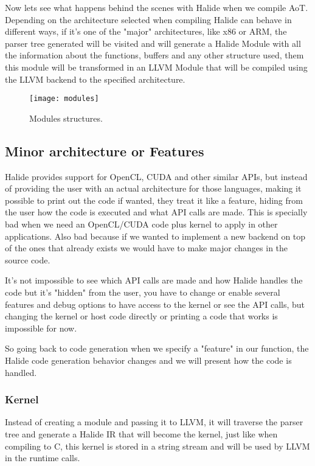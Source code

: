 \documentclass[11pt, a4paper]{article}
\begin{document}
Now lets see what happens behind the scenes with Halide when we compile AoT.
Depending on the architecture selected when compiling Halide can behave in
different ways, if it's one of the "major" architectures, like x86 or ARM, the
parser tree generated will be visited and will generate a Halide Module
with all the information about the functions, buffers and any other structure
used, them this module will be transformed in an LLVM Module that will be compiled
using the LLVM backend to the specified architecture.

\begin{figure}[H]
\centering
\texttt{[image: modules]}
\caption{Modules structures.}
\label{fig:modules}
\end{figure}

\subsection{Minor architecture or Features}

Halide provides support for OpenCL, CUDA and other similar APIs, but instead of
providing the user with an actual architecture for those languages, making it
possible to print out the code if wanted, they treat it like a feature,
hiding from the user how the code is executed and what API calls are made. This
is specially bad when we need an OpenCL/CUDA code plus kernel to apply in other
applications. Also bad because if we wanted to implement a new backend on top
of the ones that already exists we would have to make major changes in the
source code.

It's not impossible to see which API calls are made and how Halide handles the
code but it's "hidden" from the user, you have to change or enable
several features and debug options to have access to the kernel or see the API calls,
but changing the kernel or host code directly or printing a code that works
is impossible for now.

So going back to code generation when we specify a "feature" in our
function, the Halide code generation behavior changes and we will present how the
code is handled.

\subsubsection{Kernel}
Instead of creating a module and passing it to LLVM, it will traverse the parser
tree and generate a Halide IR that will become the kernel, just like when
compiling to C, this kernel is stored in a string stream and will be used by LLVM
in the runtime calls.
\end{document}
